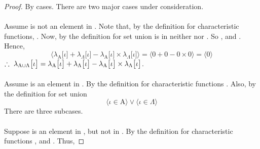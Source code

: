 \documentclass[preview]{standalone}
\begin{document}
\begin{proof}
    By cases. There are two major cases under consideration.
    \\ \\
     Assume \bm{$\iota$} is not an element in . 
    Note that, by the definition for characteristic functions, 
    .
    Now, by the definition for set union 
    \bm{$\iota$} is in neither  nor \bm{$\Lambda$}.
    So , 
    and . 
    Hence,
    \begin{equation*}
        \bigg \langle
            \lambda_{\mathrm{A}} \big[ \iota \big] 
                + 
            \lambda_{\Lambda} \big[ \iota \big] 
                - 
            \lambda_{\mathrm{A}} \big[ \iota \big] 
                \times 
            \lambda_{\Lambda} \big[ \iota \big] 
        \bigg \rangle
            =
        \bigg \langle 
            0 + 0 - 0 \times 0 
        \bigg \rangle
            =
        \bigg \langle 
            0
        \bigg \rangle
    \end{equation*}
    $\therefore \text{\space} \relax{
        \lambda_{\mathrm{A} \cup \Lambda} \big[ \iota \big] 
            = 
        \lambda_{\mathrm{A}} \big[ \iota \big] 
            + 
        \lambda_{\Lambda} \big[ \iota \big] 
            - 
        \lambda_{\mathrm{A}} \big[ \iota \big]
            \times 
        \lambda_{\Lambda} \big[ \iota \big]
    }$.
    \\ \\
     Assume \bm{$\iota$} is an element in . 
    By the definition for characteristic functions 
    . 
    Also, by the definition for set union 
    \begin{equation*}        
        \Big \langle \iota \in \mathrm{A} \Big \rangle 
            \lor 
        \Big \langle \iota \in \Lambda \Big \rangle
    \end{equation*}
    There are three subcases. 
    \\ \\
     Suppose \bm{$\iota$} is an element in , but not in \bm{$\Lambda$}.
    By the definition for characteristic functions 
    , 
    and . 
    Thus,

\end{proof}
\end{document}

